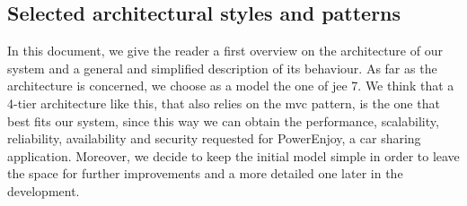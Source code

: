 \subsection{Selected architectural styles and patterns} \label{arch-styles}

In this document, we give the reader a first overview on the architecture of our system and a general and simplified description of its behaviour.
As far as the architecture is concerned, we choose as a model the one of \acl{jee} 7. We think that a 4-tier architecture like this, that also relies on the \acs{mvc} pattern, is the one that best fits our system, since this way we can obtain the performance, scalability, reliability, availability and security requested for PowerEnjoy, a car sharing application.
Moreover, we decide to keep the initial model simple in order to leave the space for further improvements and a more detailed one later in the development.

